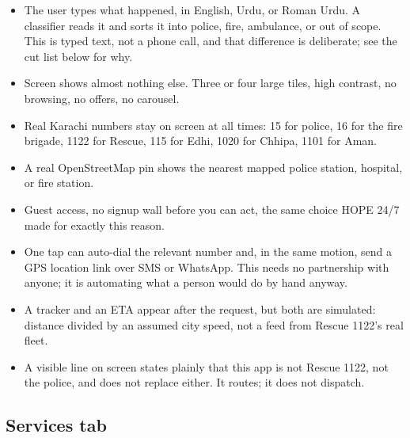 \documentclass[11pt,a4paper]{article}
\begin{document}
\begin{itemize}
  \item The user types what happened, in English, Urdu, or Roman Urdu. A classifier reads it and sorts it into police, fire, ambulance, or out of scope. This is typed text, not a phone call, and that difference is deliberate; see the cut list below for why.
  \item Screen shows almost nothing else. Three or four large tiles, high contrast, no browsing, no offers, no carousel.
  \item Real Karachi numbers stay on screen at all times: 15 for police, 16 for the fire brigade, 1122 for Rescue, 115 for Edhi, 1020 for Chhipa, 1101 for Aman.
  \item A real OpenStreetMap pin shows the nearest mapped police station, hospital, or fire station.
  \item Guest access, no signup wall before you can act, the same choice HOPE 24/7 made for exactly this reason.
  \item One tap can auto-dial the relevant number and, in the same motion, send a GPS location link over SMS or WhatsApp. This needs no partnership with anyone; it is automating what a person would do by hand anyway.
  \item A tracker and an ETA appear after the request, but both are simulated: distance divided by an assumed city speed, not a feed from Rescue 1122's real fleet.
  \item A visible line on screen states plainly that this app is not Rescue 1122, not the police, and does not replace either. It routes; it does not dispatch.
\end{itemize}

\subsection{Services tab}
\end{document}
